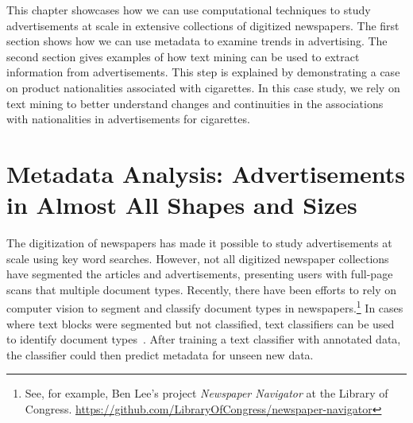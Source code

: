 \documentclass[USenglish]{article}
\begin{document}
This chapter showcases how we can use computational techniques to study advertisements at scale in extensive collections of digitized newspapers. The first section shows how we can use metadata to examine trends in advertising. The second section gives examples of how text mining can be used to extract information from advertisements. This step is explained by demonstrating a case on product nationalities associated with cigarettes. In this case study, we rely on text mining to better understand changes and continuities in the associations with nationalities in advertisements for cigarettes.

\section{Metadata Analysis: Advertisements in Almost All Shapes and Sizes}

The digitization of newspapers has made it possible to study advertisements at scale using key word searches. However, not all digitized newspaper collections have segmented the articles and advertisements, presenting users with full-page scans that multiple document types. Recently, there have been efforts to rely on computer vision to segment and classify document types in newspapers.\footnote{See, for example, Ben Lee's project \textit{Newspaper Navigator} at the Library of Congress. \url{https://github.com/LibraryOfCongress/newspaper-navigator}} In cases where text blocks were segmented but not classified, text classifiers can be used to identify document types~\cite{bilgin_utilizing_2018}. After training a text classifier with annotated data, the classifier could then predict metadata for unseen new data. 
\end{document}
